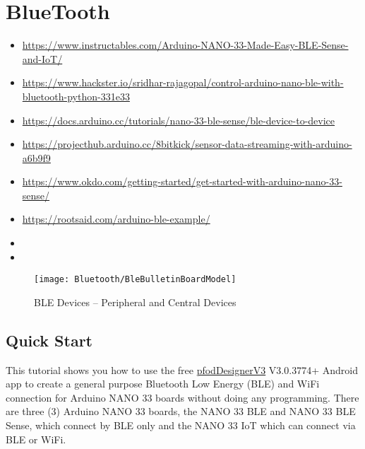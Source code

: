 %
%
%



\chapter{BlueTooth}

\begin{itemize}
  \item \url{https://www.instructables.com/Arduino-NANO-33-Made-Easy-BLE-Sense-and-IoT/}
  \item \url{https://www.hackster.io/sridhar-rajagopal/control-arduino-nano-ble-with-bluetooth-python-331e33}
  \item \url{https://docs.arduino.cc/tutorials/nano-33-ble-sense/ble-device-to-device}
  \item \url{https://projecthub.arduino.cc/8bitkick/sensor-data-streaming-with-arduino-a6b9f9}
  \item \url{https://www.okdo.com/getting-started/get-started-with-arduino-nano-33-sense/}
  \item \url{https://rootsaid.com/arduino-ble-example/}
  \item {}
  \item {}
\end{itemize}


\begin{figure}
    \texttt{[image: Bluetooth/BleBulletinBoardModel]}
    \caption{BLE Devices -- Peripheral and Central Devices}    
\end{figure}


\section{Quick Start}

This tutorial shows you how to use the free \href{https://www.forward.com.au/pfod/pfodDesigner/index.html}{pfodDesignerV3} V3.0.3774+ Android app to create a general purpose Bluetooth Low Energy (BLE) and WiFi connection for Arduino NANO 33 boards without doing any programming. There are three (3) Arduino NANO 33 boards, the NANO 33 BLE and NANO 33 BLE Sense, which connect by BLE only and the NANO 33 IoT which can connect via BLE or WiFi.
    
